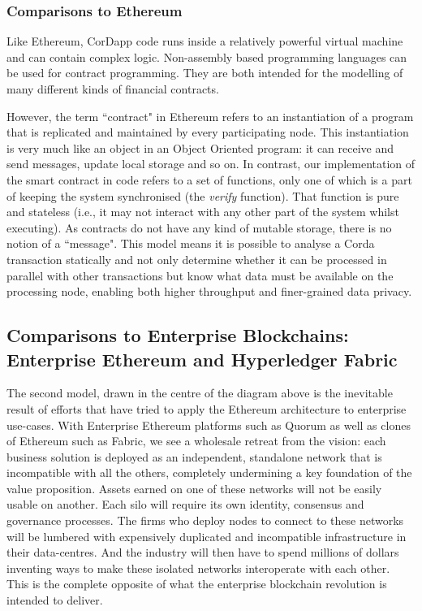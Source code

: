 \documentclass{article}
\begin{document}
\subsubsection{Comparisons to Ethereum}
Like Ethereum, CorDapp code runs inside a relatively powerful virtual machine and can contain complex logic. Non-assembly based programming languages can be used for contract programming.  They are both intended for the modelling of many different kinds of financial contracts.

However, the term ``contract" in Ethereum refers to an instantiation of a program that is replicated and maintained by every participating node. This instantiation is very much like an object in an Object Oriented program: it can receive and send messages, update local storage and so on. In contrast, our implementation of the smart contract in code refers to a set of functions, only one of which is a part of keeping the system synchronised (the \textit{verify} function). That function is pure and stateless (i.e., it may not interact with any other part of the system whilst executing).	As contracts do not have any kind of mutable storage, there is no notion of a ``message". This model means it is possible to analyse a Corda transaction statically and not only determine whether it can be processed in parallel with other transactions but know what data must be available on the processing node, enabling both higher throughput and finer-grained data privacy.

\subsection{Comparisons to Enterprise Blockchains: Enterprise Ethereum and Hyperledger Fabric}

The second model, drawn in the centre of the diagram above is the inevitable result of efforts that have tried to apply the Ethereum architecture to enterprise use-cases. With Enterprise Ethereum platforms such as Quorum as well as clones of Ethereum such as Fabric, we see a wholesale retreat from the vision: each business solution is deployed as an independent, standalone network that is incompatible with all the others, completely undermining a key foundation of the value proposition.  Assets earned on one of these networks will not be easily usable on another. Each silo will require its own identity, consensus and governance processes.  The firms who deploy nodes to connect to these networks will be lumbered with expensively duplicated and incompatible infrastructure in their data-centres. And the industry will then have to spend millions of dollars inventing ways to make these isolated networks interoperate with each other. This is the complete opposite of what the enterprise blockchain revolution is intended to deliver.
\end{document}
